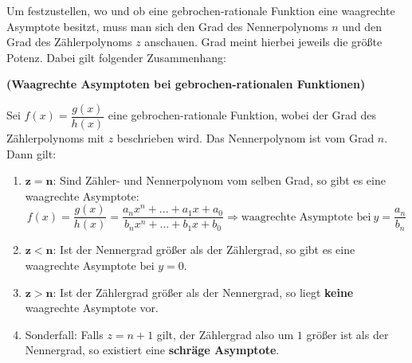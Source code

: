 \documentclass[ngerman, 12pt]{nssheetxea}
\begin{document}
Um festzustellen, wo und ob eine gebrochen-rationale Funktion eine waagrechte Asymptote besitzt, muss man sich den Grad des Nennerpolynoms $n$ und den Grad des Zählerpolynoms $z$ anschauen. Grad meint hierbei jeweils die größte Potenz. Dabei gilt folgender Zusammenhang:

\begin{theorem} \textbf{(Waagrechte Asymptoten bei gebrochen-rationalen Funktionen)} \par
Sei $f(x)=\dfrac{g(x)}{h(x)}$ eine gebrochen-rationale Funktion, wobei der Grad des Zählerpolynoms mit $z$ beschrieben wird. Das Nennerpolynom ist vom Grad $n$. Dann gilt:
\begin{enumerate}
\item $\mathbf{z=n}$: Sind Zähler- und Nennerpolynom vom selben Grad, so gibt es eine waagrechte Asymptote: 
\[ f(x) = \dfrac{g(x)}{h(x)} = \dfrac{a_nx^n+...+a_1x+a_0}{b_nx^n+...+b_1x+b_0} \Rightarrow \text{waagrechte Asymptote bei} \ y=\dfrac{a_n}{b_n}\]
\item $\mathbf{z<n}$: Ist der Nennergrad größer als der Zählergrad, so gibt es eine waagrechte Asymptote bei $y=0$.
\item $\mathbf{z>n}$: Ist der Zählergrad größer als der Nennergrad, so liegt \textbf{keine} waagrechte Asymptote vor.
\item Sonderfall: Falls $z=n+1$ gilt, der Zählergrad also um $1$ größer ist als der Nennergrad, so existiert eine \textbf{schräge Asymptote}.
\end{enumerate}
\label{Satz:Waag_Asympt}
 
\end{theorem}
\end{document}
